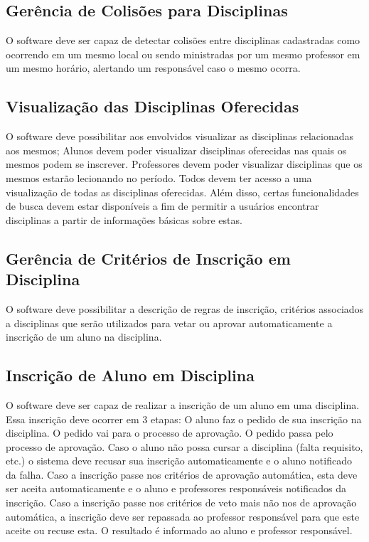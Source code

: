 \documentclass{article}
\begin{document}
\subsection{Gerência de Colisões para Disciplinas}
O software deve ser capaz de detectar colisões entre disciplinas cadastradas como ocorrendo em um mesmo local ou sendo ministradas por um mesmo professor em um mesmo horário, alertando um responsável caso o mesmo ocorra.
\subsection{Visualização das Disciplinas Oferecidas}
O software deve possibilitar aos envolvidos visualizar as disciplinas relacionadas aos mesmos;
Alunos devem poder visualizar disciplinas oferecidas nas quais os mesmos podem se inscrever.
Professores devem poder visualizar disciplinas que os mesmos estarão lecionando no período.
Todos devem ter acesso a uma visualização de todas as disciplinas oferecidas.
Além disso, certas funcionalidades de busca devem estar disponíveis a fim de permitir a usuários encontrar disciplinas a partir de informações básicas sobre estas.
\subsection{Gerência de Critérios de Inscrição em Disciplina}
O software deve possibilitar a descrição de regras de inscrição, critérios associados a disciplinas que serão utilizados para vetar ou aprovar automaticamente a inscrição de um aluno na disciplina. 
\subsection{Inscrição de Aluno em Disciplina}
O software deve ser capaz de realizar a inscrição de um aluno em uma disciplina. Essa inscrição deve ocorrer em 3 etapas:
O aluno faz o pedido de sua inscrição na disciplina. O pedido vai para o processo de aprovação.
O pedido passa pelo processo de aprovação.
Caso o aluno não possa cursar a disciplina (falta requisito, etc.) o sistema deve recusar sua inscrição automaticamente e o aluno notificado da falha.
Caso a inscrição passe nos critérios de aprovação automática, esta deve ser aceita automaticamente e o aluno e professores responsáveis notificados da inscrição.
Caso a inscrição passe nos critérios de veto mais não nos de aprovação automática, a inscrição deve ser repassada ao professor responsável para que este aceite ou recuse esta.
O resultado é informado ao aluno e professor responsável.
\end{document}
